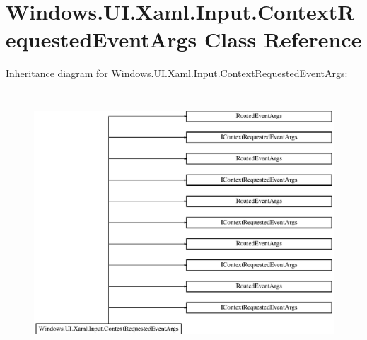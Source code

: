 \hypertarget{class_windows_1_1_u_i_1_1_xaml_1_1_input_1_1_context_requested_event_args}{}\section{Windows.\+U\+I.\+Xaml.\+Input.\+Context\+Requested\+Event\+Args Class Reference}
\label{class_windows_1_1_u_i_1_1_xaml_1_1_input_1_1_context_requested_event_args}
Inheritance diagram for Windows.\+U\+I.\+Xaml.\+Input.\+Context\+Requested\+Event\+Args\+:\begin{figure}[H]
\begin{center}
\leavevmode
\includegraphics[height=9.903537cm]{class_windows_1_1_u_i_1_1_xaml_1_1_input_1_1_context_requested_event_args}
\end{center}
\end{figure}
